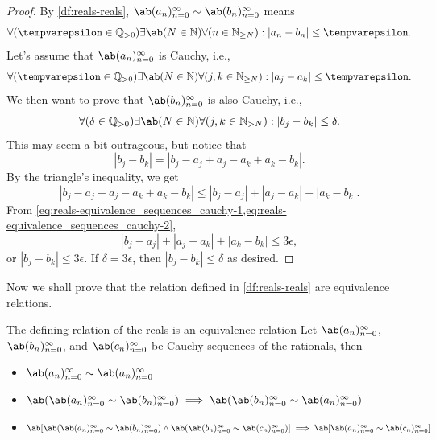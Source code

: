 \begin{proof}
  By \cref{df:reals-reals},
  $\sequence{a_n}{n = 0}{\infty} \sim \sequence{b_n}{n = 0}{\infty}$ means
  \begin{equation}
    \forall (\epsilon \in \mathbb{Q}_{>0}) \exists \ab(N \in \mathbb{N}) \forall (n \in \mathbb{N}_{\geq N}) : |a_n - b_n| \leq \epsilon.
  \end{equation}
  Let's assume that $\sequence{a_n}{n = 0}{\infty}$ is Cauchy, i.e.,
  \begin{equation}
    \forall (\epsilon \in \mathbb{Q}_{>0}) \exists \ab(N \in \mathbb{N}) \forall (j, k \in \mathbb{N}_{\geq N}) : |a_j - a_k| \leq \epsilon. \label{eq:reals-equivalence_sequences_cauchy-1}
  \end{equation}
  We then want to prove that $\sequence{b_n}{n = 0}{\infty}$ is also Cauchy, i.e.,
  \begin{equation*}
    \forall (\delta \in \mathbb{Q}_{>0}) \exists \ab(N \in \mathbb{N}) \forall (j, k \in \mathbb{N}_{>N}) : |b_j - b_k| \leq \delta. \label{eq:reals-equivalence_sequences_cauchy-2}
  \end{equation*}
  This may seem a bit outrageous, but notice that
  \begin{equation}
    |b_j - b_k| = |b_j - a_j + a_j - a_k + a_k - b_k|.
  \end{equation}
  By the triangle's inequality, we get
  \begin{equation}
    |b_j - a_j + a_j - a_k + a_k - b_k| \leq |b_j - a_j| + |a_j - a_k| + |a_k - b_k|.
  \end{equation}
  From \cref{eq:reals-equivalence_sequences_cauchy-1,eq:reals-equivalence_sequences_cauchy-2},
  \begin{equation}
    |b_j - a_j| + |a_j - a_k| + |a_k - b_k| \leq 3 \epsilon,
  \end{equation}
  or $|b_j - b_k| \leq 3\epsilon$. If $\delta = 3\epsilon$, then $|b_j - b_k| \leq \delta$
  as desired.
\end{proof}

Now we shall prove that the relation defined in \cref{df:reals-reals} are equivalence relations.

\begin{prop}{The defining relation of the reals is an equivalence relation}{}
  Let \(\sequence{a_n}{n = 0}{\infty}\), \(\sequence{b_n}{n = 0}{\infty}\), and
  \(\sequence{c_n}{n = 0}{\infty}\) be Cauchy sequences of the rationals, then
  \begin{itemize}
    \item \(\sequence{a_n}{n = 0}{\infty} \sim \sequence{a_n}{n = 0}{\infty}\)
    \item \(\ab(\sequence{a_n}{n = 0}{\infty} \sim \sequence{b_n}{n = 0}{\infty}) \implies \ab(\sequence{b_n}{n = 0}{\infty} \sim \sequence{a_n}{n = 0}{\infty})\)
    \item \(\ab[\ab(\sequence{a_n}{n = 0}{\infty} \sim \sequence{b_n}{n = 0}{\infty}) \land \ab(\sequence{b_n}{n = 0}{\infty} \sim \sequence{c_n}{n = 0}{\infty})] \\
          \implies \ab[\sequence{a_n}{n = 0}{\infty} \sim \sequence{c_n}{n = 0}{\infty}]\)
  \end{itemize}
\end{prop}

